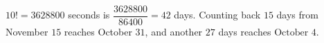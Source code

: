 $10!=3628800$ seconds is $\dfrac{3628800}{86400}=42$ days. Counting back $15$ days from November $15$ reaches October $31$, and another $27$ days reaches $\boxed{\text{October }4}$.

